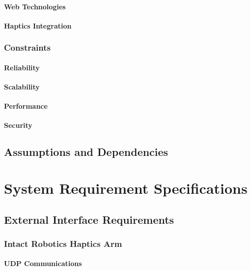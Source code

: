 \documentclass[11pt]{report}
\begin{document}
\subsubsection{Web Technologies}

\subsubsection{Haptics Integration}
 
\subsection{Constraints}

\subsubsection{Reliability}

\subsubsection{Scalability}

\subsubsection{Performance}

\subsubsection{Security} 
 
\section{Assumptions and Dependencies}

\chapter{System Requirement Specifications}

\section{External Interface Requirements}

\subsection{Intact Robotics Haptics Arm}

\subsubsection{UDP Communications}
\end{document}
